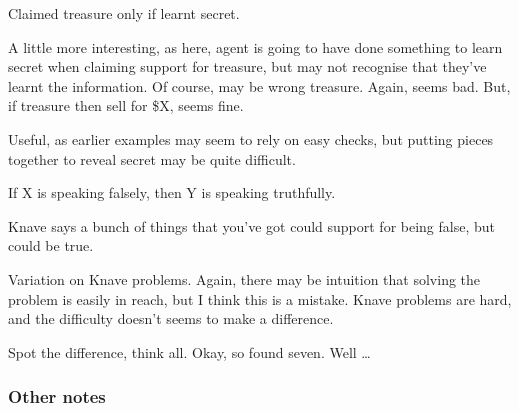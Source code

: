 \begin{note}[Treasure]
  \begin{illustration}
    Claimed treasure only if learnt secret.
  \end{illustration}
  A little more interesting, as here, agent is going to have done something to learn secret when claiming support for treasure, but may not recognise that they've learnt the information.
  Of course, may be wrong treasure.
  Again, seems bad.
  But, if treasure then sell for \$X, seems fine.

  Useful, as earlier examples may seem to rely on easy checks, but putting pieces together to reveal secret may be quite difficult.
\end{note}

\begin{note}[Knaves]
  \begin{illustration}
    If X is speaking falsely, then Y is speaking truthfully.

    Knave says a bunch of things that you've got could support for being false, but could be true.
  \end{illustration}
  Variation on Knave problems.
  Again, there may be intuition that solving the problem is easily in reach, but I think this is a mistake.
  Knave problems are hard, and the difficulty doesn't seems to make a difference.
\end{note}

\begin{note}
  Spot the difference, think all.
  Okay, so found seven.
  Well \dots
\end{note}

\newpage

\subsubsection{Other notes}
\label{sec:other-notes}

